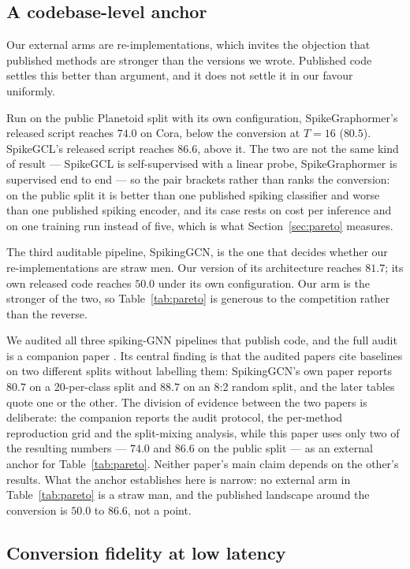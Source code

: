\documentclass[10pt,twocolumn]{article}
\newcommand{\tabref}[1]{Table~\ref{#1}}
\newcommand{\secref}[1]{Section~\ref{#1}}
\begin{document}
\subsection{A codebase-level anchor}
\label{sec:audit}

Our external arms are re-implementations, which invites the objection that published methods are
stronger than the versions we wrote. Published code settles this better than argument, and it does
not settle it in our favour uniformly.

Run on the public Planetoid split with its own configuration, SpikeGraphormer's released script
reaches $74.0$ on Cora, below the conversion at $T=16$ ($80.5$). SpikeGCL's released script reaches
$86.6$, above it. The two are not the same kind of result --- SpikeGCL is self-supervised with a
linear probe, SpikeGraphormer is supervised end to end --- so the pair brackets rather than ranks the
conversion: on the public split it is better than one published spiking classifier and worse than one
published spiking encoder, and its case rests on cost per inference and on one training run instead of
five, which is what \secref{sec:pareto} measures.

The third auditable pipeline, SpikingGCN, is the one that decides whether our re-implementations are
straw men. Our version of its architecture reaches $81.7$; its own released code reaches $50.0$ under
its own configuration. Our arm is the stronger of the two, so \tabref{tab:pareto} is generous to the
competition rather than the reverse.

We audited all three spiking-GNN pipelines that publish code, and the full audit is a companion
paper \citep{companion}. Its central finding is that the audited papers cite baselines on two
different splits without labelling them: SpikingGCN's own paper reports $80.7$ on a 20-per-class
split and $88.7$ on an 8:2 random split, and the later tables quote one or the other. The division
of evidence between the two papers is deliberate: the companion reports the audit protocol, the
per-method reproduction grid and the split-mixing analysis, while this paper uses only two of the
resulting numbers --- $74.0$ and $86.6$ on the public split --- as an external anchor for
\tabref{tab:pareto}. Neither paper's main claim depends on the other's results. What the anchor
establishes here is narrow: no external arm in \tabref{tab:pareto} is a straw man, and the published
landscape around the conversion is $50.0$ to $86.6$, not a point.

\subsection{Conversion fidelity at low latency}
\label{sec:fidelity}
\end{document}
